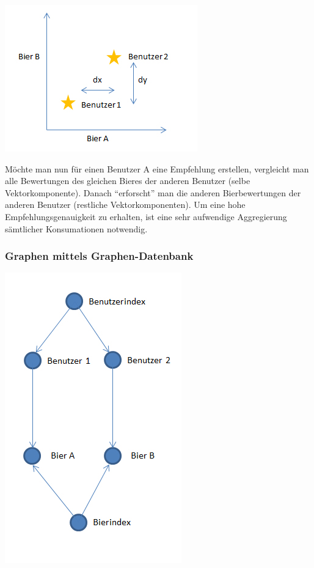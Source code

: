 \documentclass[10pt,a4paper]{scrartcl}
\begin{document}
\includegraphics[scale=1]{vektor.jpg} 

Möchte man nun für einen Benutzer A eine Empfehlung erstellen, vergleicht man alle Bewertungen des
gleichen Bieres der anderen Benutzer (selbe Vektorkomponente). Danach "`erforscht"' man die anderen
Bierbewertungen der anderen Benutzer (restliche Vektorkomponenten). Um eine hohe
Empfehlungsgenauigkeit zu erhalten, ist eine sehr aufwendige Aggregierung sämtlicher Konsumationen
notwendig.

\subsubsection{Graphen mittels Graphen-Datenbank}

\includegraphics[scale=0.7]{graph.jpg} 
\end{document}
